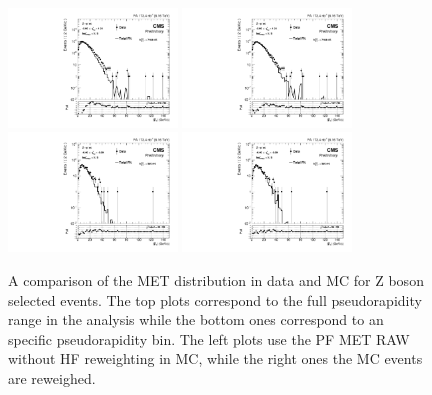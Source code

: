 \begin{figure}[!h]
\begin{center}
\includegraphics[width=0.4\textwidth]{Figures/WBoson/Analysis/Correction/Recoil/CheckFits/Z/METPF_RAW/PLOT_MET_DATA_ZToMuMi_PA_Model_TEMP_DY_MuEtaCM_m286_193_MuIso_0_15.pdf}
\includegraphics[width=0.4\textwidth]{Figures/WBoson/Analysis/Correction/Recoil/CheckFits/Z/METPF_RAW_HFrew/PLOT_MET_DATA_ZToMuMi_PA_Model_TEMP_DY_MuEtaCM_m286_193_MuIso_0_15.pdf} \\
\includegraphics[width=0.4\textwidth]{Figures/WBoson/Analysis/Correction/Recoil/CheckFits/Z/METPF_RAW/PLOT_MET_DATA_ZToMuMi_PA_Model_TEMP_DY_MuEtaCM_m40_m20_MuIso_0_15.pdf}
\includegraphics[width=0.4\textwidth]{Figures/WBoson/Analysis/Correction/Recoil/CheckFits/Z/METPF_RAW_HFrew/PLOT_MET_DATA_ZToMuMi_PA_Model_TEMP_DY_MuEtaCM_m40_m20_MuIso_0_15.pdf}
\caption{A comparison of the MET distribution in data and MC for Z boson selected events. 
The top plots correspond to the full pseudorapidity range in the analysis while the bottom ones correspond to an specific pseudorapidity bin. The left plots use the PF MET RAW without HF reweighting in MC, while the right ones the MC events are reweighed.}
\label{fig:HFrewCheck}
\end{center}
\end{figure}


